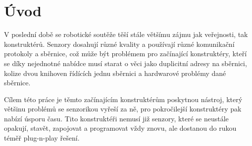\chapter*{Úvod}
V poslední době se robotické soutěže těší stále většímu zájmu jak veřejnosti, tak konstruktérů.
Senzory dosahují různé kvality a používají různé komunikační protokoly a sběrnice, což může být problémem pro začínající konstruktéry, kteří se díky nejednotné nabídce musí starat o věci jako duplicitní adresy na sběrnici, kolize dvou knihoven řídících jednu sběrnici a hardwarové problémy dané sběrnice.

Cílem této práce je těmto začínajícím konstruktérům poskytnou nástroj, který většinu problémů se senzorikou vyřeší za ně, pro pokročilejší konstruktéry pak nabízí úsporu času.
Tito konstruktéři nemusí již senzory, které se neustále opakují, stavět, zapojovat a programovat vždy znovu, ale dostanou do rukou téměř plug-n-play řešení.


\newpage